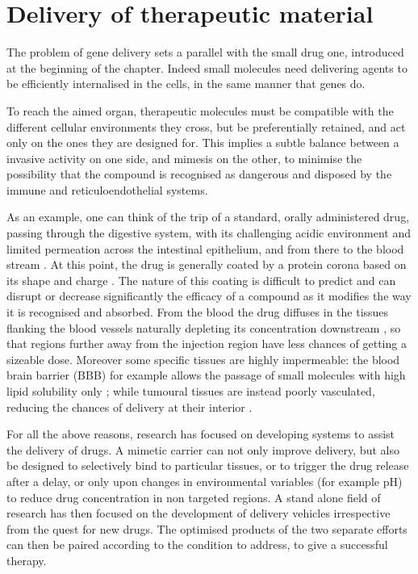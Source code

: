 \section{Delivery of therapeutic material}
The problem of gene delivery sets a parallel with the small drug one, introduced at the beginning of the chapter. Indeed small molecules need delivering agents to be efficiently internalised in the cells, in the same manner that genes do.

To reach the aimed organ, therapeutic molecules must be compatible with the different cellular environments they cross, but be preferentially retained, and act only on the ones they are designed for. This implies a subtle balance between a invasive activity on one side, and mimesis on the other, to minimise the possibility that the compound is recognised as dangerous and disposed by the immune and reticuloendothelial systems.

As an example, one can think of the trip of a standard, orally administered drug, passing through the digestive system, with its challenging acidic environment and limited permeation across the intestinal epithelium, and from there to the blood stream \citep{Masaoka2006, Mitragotri2014}. 
%
At this point, the drug is generally coated by a protein corona based on its shape and charge \citep{Krol2012}. The nature of this coating is difficult to predict and can disrupt or decrease significantly the efficacy of a compound as it modifies the way it is recognised and absorbed.
%
From the blood the drug diffuses in the tissues flanking the blood vessels naturally depleting its concentration downstream \citep{Krol2012}, so that regions further away from the injection region have less chances of getting a sizeable dose. 
%
Moreover some specific tissues are highly impermeable: the blood brain barrier (BBB) for example allows the passage of small molecules with high lipid solubility only \citep{Pattni2015, Krol2012}; while tumoural tissues are instead poorly vasculated, reducing the chances of delivery at their interior \citep{Pattni2015}.

For all the above reasons, research has focused on developing systems to assist the delivery of drugs. A mimetic carrier can not only improve delivery, but also be designed to selectively bind to particular tissues, or to trigger the drug release after a delay, or only upon changes in environmental variables (for example pH) to reduce drug concentration in non targeted regions. A stand alone field of research has then focused on the development of delivery vehicles irrespective from the quest for new drugs. The optimised products of the two separate efforts can then be paired according to the condition to address, to give a successful therapy.

